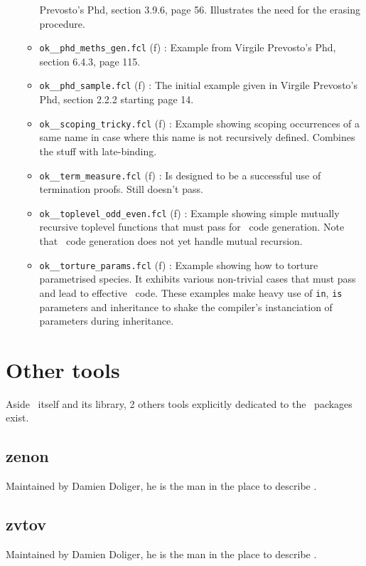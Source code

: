 \begin{itemize}
\begin{itemize}
      Prevosto's Phd, section 3.9.6, page 56. Illustrates the need for
      the erasing procedure.
    \item {\tt ok\_\_phd\_meths\_gen.fcl} (f) : Example from Virgile
      Prevosto's Phd, section 6.4.3, page 115.
    \item {\tt ok\_\_phd\_sample.fcl} (f) : The initial example given
      in Virgile Prevosto's Phd, section 2.2.2 starting page 14.
    \item {\tt ok\_\_scoping\_tricky.fcl} (f) : Example showing
      scoping occurrences of a same name in case where this name is not
      recursively defined. Combines the stuff with late-binding.
    \item {\tt ok\_\_term\_measure.fcl} (f) : Is designed to be a
      successful use of termination proofs. Still doesn't pass.
    \item {\tt ok\_\_toplevel\_odd\_even.fcl} (f) : Example showing
      simple  mutually recursive toplevel functions that must pass for
      \ocaml\ code generation. Note that \coq\ code generation does
      not yet handle mutual recursion.
    \item {\tt ok\_\_torture\_params.fcl} (f) : Example showing how to
      torture parametrised species. It exhibits various non-trivial
      cases that must pass and lead to effective \ocaml\/\coq\
      code. These examples make heavy use of {\tt in}, {\tt is}
      parameters and inheritance to shake the compiler's instanciation
      of parameters during inheritance.
  \end{itemize}
\end{itemize}

\section{Other tools}
Aside \focalizec\ itself and its library, 2 others tools explicitly
dedicated to the \focalize\ packages exist.

\subsection{zenon}
Maintained by Damien Doliger, he is the man in the place to describe
\smiley.

\subsection{zvtov}
Maintained by Damien Doliger, he is the man in the place to describe
\smiley.
